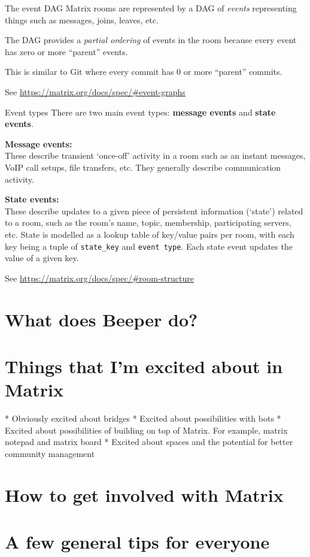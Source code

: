 \documentclass{acm}
\begin{document}
\begin{frame}{The event DAG}
    Matrix rooms are represented by a DAG of \textit{events} representing things
    such as messages, joins, leaves, etc.
    \pause

    The DAG provides a \textit{partial ordering} of events in the room because
    every event has zero or more ``parent'' events.
    \pause

    This is similar to Git where every commit has 0 or more ``parent'' commits.

    \vspace{1cm}
    {
        \tiny
        See \url{https://matrix.org/docs/spec/\#event-graphs}
    }
\end{frame}

\begin{frame}{Event types}
    There are two main event types: \textbf{message events} and \textbf{state
    events}.
    \pause

    \textbf{Message events:} \\
    These describe transient `once-off' activity in a room such as an instant
    messages, VoIP call setups, file transfers, etc. They generally describe
    communication activity.
    \pause

    \textbf{State events:} \\
    These describe updates to a given piece of persistent information (`state')
    related to a room, such as the room's name, topic, membership, participating
    servers, etc. State is modelled as a lookup table of key/value pairs per
    room, with each key being a tuple of \texttt{state\_key} and \texttt{event
    type}. Each state event updates the value of a given key.

    {
        \tiny
        See \url{https://matrix.org/docs/spec/\#room-structure}
    }
\end{frame}

\section{What does Beeper do?}


\section{Things that I'm excited about in Matrix}

\begin{frame}
  * Obviously excited about bridges
  * Excited about possibilities with bots
  * Excited about possibilities of building on top of Matrix. For example,
    matrix notepad and matrix board
  * Excited about spaces and the potential for better community management
\end{frame}

\section{How to get involved with Matrix}

\section{A few general tips for everyone}
\end{document}
